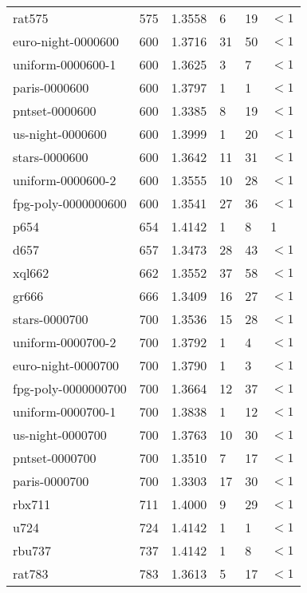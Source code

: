 \begin{longtable}{|lrrlll|}
rat575 & 575 & \num{1.3558} & \num{6} & \num{19} & $<1$ \\
euro-night-0000600 & 600 & \num{1.3716} & \num{31} & \num{50} & $<1$ \\
uniform-0000600-1 & 600 & \num{1.3625} & \num{3} & \num{7} & $<1$ \\
paris-0000600 & 600 & \num{1.3797} & \num{1} & \num{1} & $<1$ \\
pntset-0000600 & 600 & \num{1.3385} & \num{8} & \num{19} & $<1$ \\
us-night-0000600 & 600 & \num{1.3999} & \num{1} & \num{20} & $<1$ \\
stars-0000600 & 600 & \num{1.3642} & \num{11} & \num{31} & $<1$ \\
uniform-0000600-2 & 600 & \num{1.3555} & \num{10} & \num{28} & $<1$ \\
fpg-poly-0000000600 & 600 & \num{1.3541} & \num{27} & \num{36} & $<1$ \\
p654 & 654 & \num{1.4142} & \num{1} & \num{8} & \num{1} \\
d657 & 657 & \num{1.3473} & \num{28} & \num{43} & $<1$ \\
xql662 & 662 & \num{1.3552} & \num{37} & \num{58} & $<1$ \\
gr666 & 666 & \num{1.3409} & \num{16} & \num{27} & $<1$ \\
stars-0000700 & 700 & \num{1.3536} & \num{15} & \num{28} & $<1$ \\
uniform-0000700-2 & 700 & \num{1.3792} & \num{1} & \num{4} & $<1$ \\
euro-night-0000700 & 700 & \num{1.3790} & \num{1} & \num{3} & $<1$ \\
fpg-poly-0000000700 & 700 & \num{1.3664} & \num{12} & \num{37} & $<1$ \\
uniform-0000700-1 & 700 & \num{1.3838} & \num{1} & \num{12} & $<1$ \\
us-night-0000700 & 700 & \num{1.3763} & \num{10} & \num{30} & $<1$ \\
pntset-0000700 & 700 & \num{1.3510} & \num{7} & \num{17} & $<1$ \\
paris-0000700 & 700 & \num{1.3303} & \num{17} & \num{30} & $<1$ \\
rbx711 & 711 & \num{1.4000} & \num{9} & \num{29} & $<1$ \\
u724 & 724 & \num{1.4142} & \num{1} & \num{1} & $<1$ \\
rbu737 & 737 & \num{1.4142} & \num{1} & \num{8} & $<1$ \\
rat783 & 783 & \num{1.3613} & \num{5} & \num{17} & $<1$ \\

\end{longtable}
